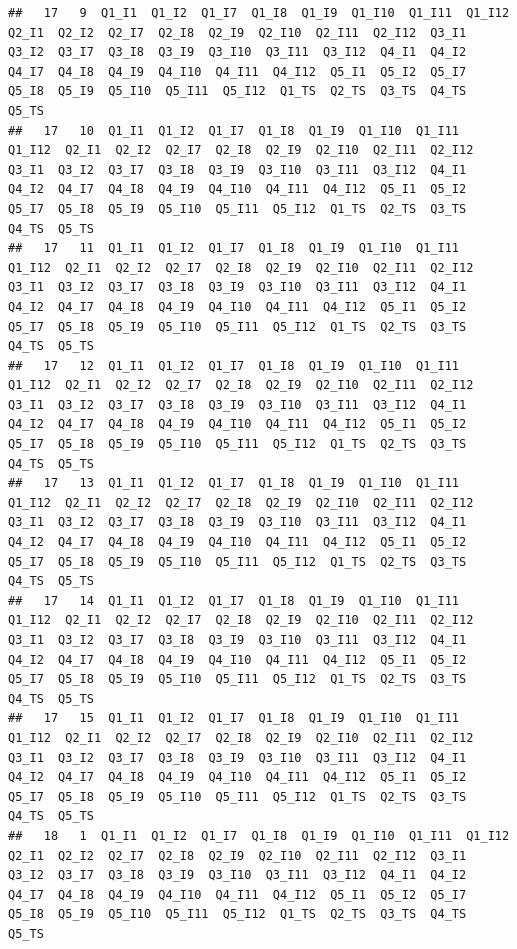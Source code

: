 \documentclass[]{book}
\begin{document}
\begin{verbatim}
##   17   9  Q1_I1  Q1_I2  Q1_I7  Q1_I8  Q1_I9  Q1_I10  Q1_I11  Q1_I12  Q2_I1  Q2_I2  Q2_I7  Q2_I8  Q2_I9  Q2_I10  Q2_I11  Q2_I12  Q3_I1  Q3_I2  Q3_I7  Q3_I8  Q3_I9  Q3_I10  Q3_I11  Q3_I12  Q4_I1  Q4_I2  Q4_I7  Q4_I8  Q4_I9  Q4_I10  Q4_I11  Q4_I12  Q5_I1  Q5_I2  Q5_I7  Q5_I8  Q5_I9  Q5_I10  Q5_I11  Q5_I12  Q1_TS  Q2_TS  Q3_TS  Q4_TS  Q5_TS
##   17   10  Q1_I1  Q1_I2  Q1_I7  Q1_I8  Q1_I9  Q1_I10  Q1_I11  Q1_I12  Q2_I1  Q2_I2  Q2_I7  Q2_I8  Q2_I9  Q2_I10  Q2_I11  Q2_I12  Q3_I1  Q3_I2  Q3_I7  Q3_I8  Q3_I9  Q3_I10  Q3_I11  Q3_I12  Q4_I1  Q4_I2  Q4_I7  Q4_I8  Q4_I9  Q4_I10  Q4_I11  Q4_I12  Q5_I1  Q5_I2  Q5_I7  Q5_I8  Q5_I9  Q5_I10  Q5_I11  Q5_I12  Q1_TS  Q2_TS  Q3_TS  Q4_TS  Q5_TS
##   17   11  Q1_I1  Q1_I2  Q1_I7  Q1_I8  Q1_I9  Q1_I10  Q1_I11  Q1_I12  Q2_I1  Q2_I2  Q2_I7  Q2_I8  Q2_I9  Q2_I10  Q2_I11  Q2_I12  Q3_I1  Q3_I2  Q3_I7  Q3_I8  Q3_I9  Q3_I10  Q3_I11  Q3_I12  Q4_I1  Q4_I2  Q4_I7  Q4_I8  Q4_I9  Q4_I10  Q4_I11  Q4_I12  Q5_I1  Q5_I2  Q5_I7  Q5_I8  Q5_I9  Q5_I10  Q5_I11  Q5_I12  Q1_TS  Q2_TS  Q3_TS  Q4_TS  Q5_TS
##   17   12  Q1_I1  Q1_I2  Q1_I7  Q1_I8  Q1_I9  Q1_I10  Q1_I11  Q1_I12  Q2_I1  Q2_I2  Q2_I7  Q2_I8  Q2_I9  Q2_I10  Q2_I11  Q2_I12  Q3_I1  Q3_I2  Q3_I7  Q3_I8  Q3_I9  Q3_I10  Q3_I11  Q3_I12  Q4_I1  Q4_I2  Q4_I7  Q4_I8  Q4_I9  Q4_I10  Q4_I11  Q4_I12  Q5_I1  Q5_I2  Q5_I7  Q5_I8  Q5_I9  Q5_I10  Q5_I11  Q5_I12  Q1_TS  Q2_TS  Q3_TS  Q4_TS  Q5_TS
##   17   13  Q1_I1  Q1_I2  Q1_I7  Q1_I8  Q1_I9  Q1_I10  Q1_I11  Q1_I12  Q2_I1  Q2_I2  Q2_I7  Q2_I8  Q2_I9  Q2_I10  Q2_I11  Q2_I12  Q3_I1  Q3_I2  Q3_I7  Q3_I8  Q3_I9  Q3_I10  Q3_I11  Q3_I12  Q4_I1  Q4_I2  Q4_I7  Q4_I8  Q4_I9  Q4_I10  Q4_I11  Q4_I12  Q5_I1  Q5_I2  Q5_I7  Q5_I8  Q5_I9  Q5_I10  Q5_I11  Q5_I12  Q1_TS  Q2_TS  Q3_TS  Q4_TS  Q5_TS
##   17   14  Q1_I1  Q1_I2  Q1_I7  Q1_I8  Q1_I9  Q1_I10  Q1_I11  Q1_I12  Q2_I1  Q2_I2  Q2_I7  Q2_I8  Q2_I9  Q2_I10  Q2_I11  Q2_I12  Q3_I1  Q3_I2  Q3_I7  Q3_I8  Q3_I9  Q3_I10  Q3_I11  Q3_I12  Q4_I1  Q4_I2  Q4_I7  Q4_I8  Q4_I9  Q4_I10  Q4_I11  Q4_I12  Q5_I1  Q5_I2  Q5_I7  Q5_I8  Q5_I9  Q5_I10  Q5_I11  Q5_I12  Q1_TS  Q2_TS  Q3_TS  Q4_TS  Q5_TS
##   17   15  Q1_I1  Q1_I2  Q1_I7  Q1_I8  Q1_I9  Q1_I10  Q1_I11  Q1_I12  Q2_I1  Q2_I2  Q2_I7  Q2_I8  Q2_I9  Q2_I10  Q2_I11  Q2_I12  Q3_I1  Q3_I2  Q3_I7  Q3_I8  Q3_I9  Q3_I10  Q3_I11  Q3_I12  Q4_I1  Q4_I2  Q4_I7  Q4_I8  Q4_I9  Q4_I10  Q4_I11  Q4_I12  Q5_I1  Q5_I2  Q5_I7  Q5_I8  Q5_I9  Q5_I10  Q5_I11  Q5_I12  Q1_TS  Q2_TS  Q3_TS  Q4_TS  Q5_TS
##   18   1  Q1_I1  Q1_I2  Q1_I7  Q1_I8  Q1_I9  Q1_I10  Q1_I11  Q1_I12  Q2_I1  Q2_I2  Q2_I7  Q2_I8  Q2_I9  Q2_I10  Q2_I11  Q2_I12  Q3_I1  Q3_I2  Q3_I7  Q3_I8  Q3_I9  Q3_I10  Q3_I11  Q3_I12  Q4_I1  Q4_I2  Q4_I7  Q4_I8  Q4_I9  Q4_I10  Q4_I11  Q4_I12  Q5_I1  Q5_I2  Q5_I7  Q5_I8  Q5_I9  Q5_I10  Q5_I11  Q5_I12  Q1_TS  Q2_TS  Q3_TS  Q4_TS  Q5_TS

\end{verbatim}
\end{document}
